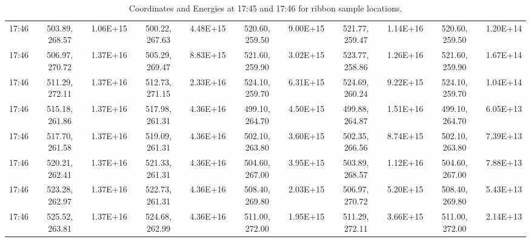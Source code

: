 \begin{table}
\begin{tabular}{|c|c|c|c|c|c|c|c|c|c|c|}
17:46 & 503.89, 268.57 & 1.06E+15 & 500.22, 267.63 & 4.48E+15 & 520.60, 259.50 & 9.00E+15 & 521.77, 259.47 & 1.14E+16 & 520.60, 259.50 & 1.20E+14\\
17:46 & 506.97, 270.72 & 1.37E+16 & 505.29, 269.47 & 8.83E+15 & 521.60, 259.90 & 3.02E+15 & 523.77, 258.86 & 1.26E+16 & 521.60, 259.90 & 1.67E+14\\
17:46 & 511.29, 272.11 & 1.37E+16 & 512.73, 271.15 & 2.33E+16 & 524.10, 259.70 & 6.31E+15 & 524.69, 260.24 & 9.22E+15 & 524.10, 259.70 & 1.04E+14\\
17:46 & 515.18, 261.86 & 1.37E+16 & 517.98, 261.31 & 4.36E+16 & 499.10, 264.70 & 4.50E+15 & 499.88, 264.87 & 1.51E+16 & 499.10, 264.70 & 6.05E+13\\
17:46 & 517.70, 261.58 & 1.37E+16 & 519.09, 261.31 & 4.36E+16 & 502.10, 263.80 & 3.60E+15 & 502.35, 266.56 & 8.74E+15 & 502.10, 263.80 & 7.39E+13\\
17:46 & 520.21, 262.41 & 1.37E+16 & 521.33, 261.31 & 4.36E+16 & 504.60, 267.00 & 3.95E+15 & 503.89, 268.57 & 1.12E+16 & 504.60, 267.00 & 7.88E+13\\
17:46 & 523.28, 262.97 & 1.37E+16 & 522.73, 261.31 & 4.36E+16 & 508.40, 269.80 & 2.03E+15 & 506.97, 270.72 & 5.20E+15 & 508.40, 269.80 & 5.43E+13\\
17:46 & 525.52, 263.81 & 1.37E+16 & 524.68, 262.99 & 4.36E+16 & 511.00, 272.00 & 1.95E+15 & 511.29, 272.11 & 3.66E+15 & 511.00, 272.00 & 2.14E+13\\
\end{tabular}
\caption{Coordinates and Energies at 17:45 and 17:46 for ribbon sample locations.}\label{ribenergytab}
\end{table}
